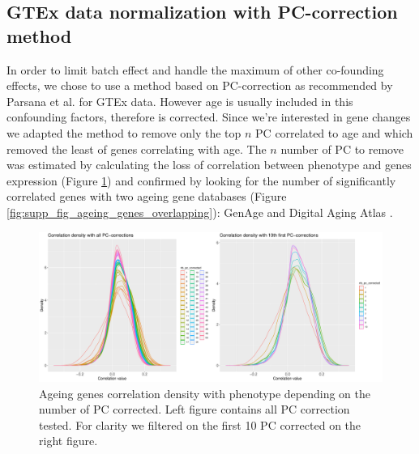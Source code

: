 

\subsection{GTEx data normalization with PC-correction method}
\label{supp:supp_pc_correction}

In order to limit batch effect and handle the maximum of other co-founding effects, we chose to use a method based on PC-correction as recommended by Parsana et al. \cite{Parsana2019} for GTEx data. However age is usually included in this confounding factors, therefore is corrected. Since we're interested in gene changes we adapted the method to remove only the top $n$ PC correlated to age and which removed the least of genes correlating with age. The $n$ number of PC to remove was estimated by calculating the loss of correlation between phenotype and genes expression (Figure \ref{fig:supp_fig_ageing_correlation_density}) and confirmed by looking for the number of significantly correlated genes with two ageing gene databases (Figure \ref{fig:supp_fig_ageing_genes_overlapping}): GenAge \cite{Tacutu2018} and Digital Aging Atlas \cite{Craig2015}.

\begin{figure}[ht]
    \includegraphics[width=\textwidth, center]{img/annexe_add_file_GWENA/additional_file_figure_2.pdf}
    \caption[Ageing genes correlation density with phenotype depending on the number of PC corrected.]{Ageing genes correlation density with phenotype depending on the number of PC corrected. Left figure contains all PC correction tested. For clarity we filtered on the first 10 PC corrected on the right figure.}
    \label{fig:supp_fig_ageing_correlation_density}
\end{figure}


